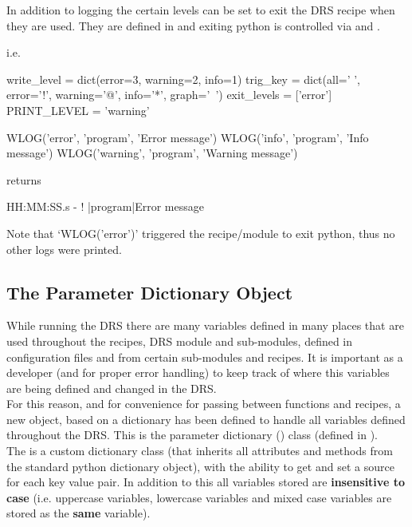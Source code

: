 \newpage 

\noindent In addition to logging the certain levels can be set to exit the DRS recipe when they are used. They are defined in  and exiting python is controlled via  and .

i.e. 
\begin{pythonbox}
write_level = dict(error=3, warning=2, info=1)
trig_key = dict(all=' ', error='!', warning='@', info='*', graph='~')
exit_levels = ['error']
PRINT_LEVEL = 'warning'

WLOG('error', 'program', 'Error message')
WLOG('info', 'program', 'Info message')
WLOG('warning', 'program', 'Warning message')

\end{pythonbox}
returns
\begin{cmdboxprint}
HH:MM:SS.s - ! |program|Error message
\end{cmdboxprint}
\begin{note}
Note that `WLOG('error')' triggered the recipe/module to exit python, thus no other logs were printed.
\end{note}

\subsection{The Parameter Dictionary Object}
\label{ch:rules:drs_specific:param_dict}

While running the DRS there are many variables defined in many places that are used throughout the recipes, DRS module and sub-modules, defined in configuration files and from certain sub-modules and recipes. It is important as a developer (and for proper error handling) to keep track of where this variables are being defined and changed in the DRS. \\

\noindent For this reason, and for convenience for passing between functions and recipes, a new object, based on a dictionary has been defined to handle all variables defined throughout the DRS. This is the parameter dictionary (\ParamDict) class (defined in \spirouConfig). \\

\noindent The \ParamDict is a custom dictionary class (that inherits all attributes and methods from the standard python dictionary object), with the ability to get and set a source for each key value pair. In addition to this all variables stored are \textbf{insensitive to case} (i.e. uppercase variables, lowercase variables and mixed case variables are stored as the \textbf{same} variable). \\

